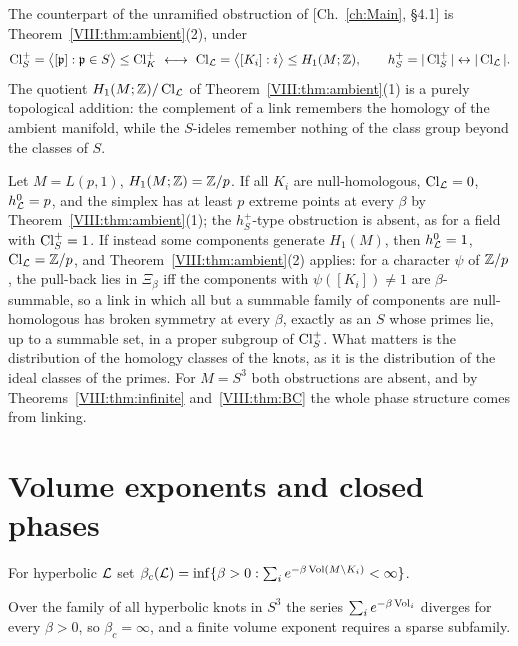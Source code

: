 \begin{corollary}\label{VIII:cor:parallel}
The counterpart of the unramified obstruction of [Ch.~\ref{ch:Main}, \S4.1] is
Theorem~\ref{VIII:thm:ambient}(2), under
\[
\operatorname{Cl}^+_S=\bigl\langle[\mathfrak{p}]:\mathfrak{p}\in S\bigr\rangle\le\operatorname{Cl}^+_K
\ \longleftrightarrow\
\operatorname{Cl}_{\mathcal{L}}=\bigl\langle[K_i]:i\bigr\rangle\le H_1(M;\mathbb{Z}),
\qquad h^+_S=|\operatorname{Cl}^+_S|\leftrightarrow|\operatorname{Cl}_{\mathcal{L}}| .
\]
The quotient $H_1(M;\mathbb{Z})/\operatorname{Cl}_{\mathcal{L}}$ of Theorem~\ref{VIII:thm:ambient}(1) is a purely topological
addition: the complement of a link remembers the homology of the ambient manifold, while the
$S$-ideles remember nothing of the class group beyond the classes of $S$.
\end{corollary}

\begin{example}\label{VIII:ex:lens}
Let $M=L(p,1)$, $H_1(M;\mathbb{Z})=\mathbb{Z}/p$. If all $K_i$ are null-homologous, $\operatorname{Cl}_{\mathcal{L}}=0$, $h^0_{\mathcal{L}}=p$,
and the simplex has at least $p$ extreme points at every $\beta$ by
Theorem~\ref{VIII:thm:ambient}(1); the $h^+_S$-type obstruction is absent, as for a field with
$\operatorname{Cl}^+_S=1$. If instead some components generate $H_1(M)$, then $h^0_{\mathcal{L}}=1$, $\operatorname{Cl}_{\mathcal{L}}=\mathbb{Z}/p$,
and Theorem~\ref{VIII:thm:ambient}(2) applies: for a character $\psi$ of $\mathbb{Z}/p$, the pull-back
lies in $\Xi_\beta$ iff the components with $\psi([K_i])\ne1$ are $\beta$-summable, so a link
in which all but a summable family of components are null-homologous has broken symmetry at
every $\beta$, exactly as an $S$ whose primes lie, up to a summable set, in a proper subgroup
of $\operatorname{Cl}^+_S$. What matters is the distribution of the homology classes of the knots, as it
is the distribution of the ideal classes of the primes. For $M=S^3$ both obstructions are
absent, and by Theorems~\ref{VIII:thm:infinite} and~\ref{VIII:thm:BC} the whole phase structure comes
from linking.
\end{example}

\section{Volume exponents and closed phases}\label{VIII:sec:volume}

\begin{definition}\label{VIII:def:volexp}
For hyperbolic $\mathcal{L}$ set
$\beta_c(\mathcal{L})=\inf\{\beta>0:\sum_ie^{-\beta\operatorname{Vol}(M\setminus K_i)}<\infty\}$.
\end{definition}

\begin{proposition}\label{VIII:prop:JT}
Over the family of all hyperbolic knots in $S^3$ the series $\sum_ie^{-\beta\operatorname{Vol}_i}$
diverges for every $\beta>0$, so $\beta_c=\infty$, and a finite volume exponent requires a
sparse subfamily.
\end{proposition}

